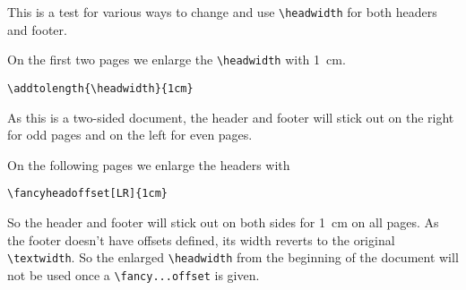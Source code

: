 \documentclass[twoside]{article}
\begin{document}
\noindent
\begin{boxedminipage}{\textwidth}
This is a test for various ways to change and use \verb|\headwidth| for both headers and footer.

On the first two pages we enlarge the \verb|\headwidth| with 1~cm. 
\begin{verbatim}
\addtolength{\headwidth}{1cm}
\end{verbatim}
As this is a two-sided document, the header and footer will stick out on the right for odd pages and on the left for even pages.

\end{boxedminipage}

\bigskip

\lipsum[1-9]

\newpage
\fancyheadoffset[LR]{1cm}

\noindent
\begin{boxedminipage}{\textwidth}
On the following pages we enlarge the headers with
\begin{verbatim}
\fancyheadoffset[LR]{1cm}
\end{verbatim}
So  the header and footer will stick out on both sides for 1~cm on all pages.
As the footer doesn't have offsets defined, its width reverts to the original \verb|\textwidth|.
So the enlarged \verb|\headwidth| from the beginning of the document will not be used once a \verb|\fancy...offset| is given.
\end{boxedminipage}
 
\bigskip

\lipsum
\end{document}

